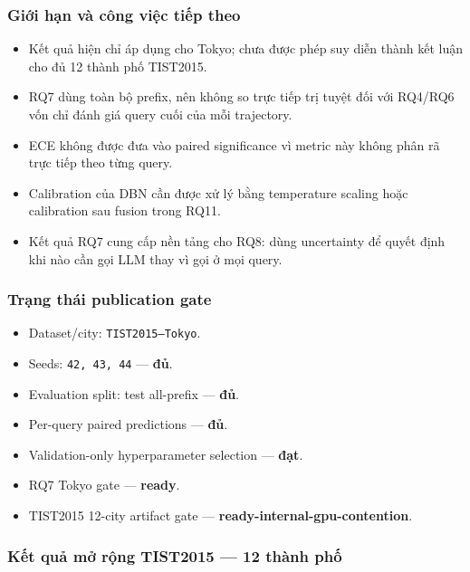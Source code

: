 \subsubsection*{Giới hạn và công việc tiếp theo}

\begin{itemize}
\item Kết quả hiện chỉ áp dụng cho Tokyo; chưa được phép suy diễn thành kết luận cho
đủ 12 thành phố TIST2015.

\item RQ7 dùng toàn bộ prefix, nên không so trực tiếp trị tuyệt đối với RQ4/RQ6 vốn
chỉ đánh giá query cuối của mỗi trajectory.

\item ECE không được đưa vào paired significance vì metric này không phân rã trực
tiếp theo từng query.

\item Calibration của DBN cần được xử lý bằng temperature scaling hoặc calibration
sau fusion trong RQ11.

\item Kết quả RQ7 cung cấp nền tảng cho RQ8: dùng uncertainty để quyết định khi nào
cần gọi LLM thay vì gọi ở mọi query.

\end{itemize}

\subsubsection*{Trạng thái publication gate}

\begin{itemize}
\item Dataset/city: \texttt{TIST2015--Tokyo}.
\item Seeds: \texttt{42, 43, 44} --- \textbf{đủ}.
\item Evaluation split: test all-prefix --- \textbf{đủ}.
\item Per-query paired predictions --- \textbf{đủ}.
\item Validation-only hyperparameter selection --- \textbf{đạt}.
\item RQ7 Tokyo gate --- \textbf{ready}.
\item TIST2015 12-city artifact gate --- \textbf{ready-internal-gpu-contention}.
\end{itemize}

\subsubsection*{Kết quả mở rộng TIST2015 --- 12 thành phố}

